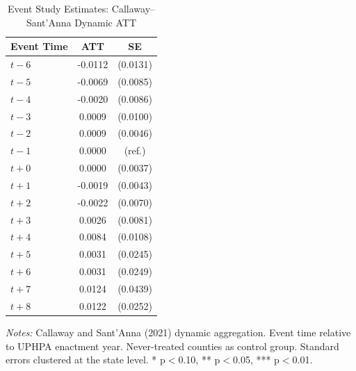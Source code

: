
\begin{table}[H]
\centering
\caption{Event Study Estimates: Callaway--Sant'Anna Dynamic ATT}
\label{tab:eventstudy}
\begin{threeparttable}
\begin{tabular}{lcc}
\toprule
Event Time & ATT & SE \\
\midrule
$t-6$ & -0.0112 & (0.0131) \\
$t-5$ & -0.0069 & (0.0085) \\
$t-4$ & -0.0020 & (0.0086) \\
$t-3$ & 0.0009 & (0.0100) \\
$t-2$ & 0.0009 & (0.0046) \\
$t-1$ & 0.0000 & (ref.) \\
$t+0$ & 0.0000 & (0.0037) \\
$t+1$ & -0.0019 & (0.0043) \\
$t+2$ & -0.0022 & (0.0070) \\
$t+3$ & 0.0026 & (0.0081) \\
$t+4$ & 0.0084 & (0.0108) \\
$t+5$ & 0.0031 & (0.0245) \\
$t+6$ & 0.0031 & (0.0249) \\
$t+7$ & 0.0124 & (0.0439) \\
$t+8$ & 0.0122 & (0.0252) \\
\bottomrule
\end{tabular}
\begin{tablenotes}[flushleft]
\small
\item \textit{Notes:} Callaway and Sant'Anna (2021) dynamic aggregation. Event time relative to UPHPA enactment year. Never-treated counties as control group. Standard errors clustered at the state level. * p$<$0.10, ** p$<$0.05, *** p$<$0.01.
\end{tablenotes}
\end{threeparttable}
\end{table}
